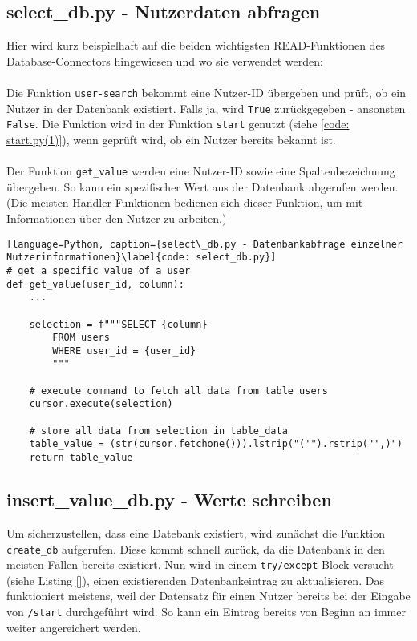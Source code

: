         \subsection{select\_db.py - Nutzerdaten abfragen} \label{Implementierung: select_db.py}
            Hier wird kurz beispielhaft auf die beiden wichtigsten READ-Funktionen des Database-Connectors hingewiesen und wo sie verwendet werden: \\
            \\
            Die Funktion \verb|user-search| bekommt eine Nutzer-ID übergeben und prüft, ob ein Nutzer in der Datenbank existiert. Falls ja, wird \verb|True| zurückgegeben - ansonsten \verb|False|. Die Funktion wird in der Funktion \verb|start| genutzt (siehe \ref*{code: start.py(1)}), wenn geprüft wird, ob ein Nutzer bereits bekannt ist.\\ 
            \\
            Der Funktion \verb|get_value| werden eine Nutzer-ID sowie eine Spaltenbezeichnung übergeben. So kann ein spezifischer Wert aus der Datenbank abgerufen werden. (Die meisten Handler-Funktionen bedienen sich dieser Funktion, um mit Informationen über den Nutzer zu arbeiten.) 
                \begin{lstlisting}[language=Python, caption={select\_db.py - Datenbankabfrage einzelner Nutzerinformationen}\label{code: select_db.py}]
# get a specific value of a user
def get_value(user_id, column):
    ...

    selection = f"""SELECT {column}
        FROM users
        WHERE user_id = {user_id}
        """

    # execute command to fetch all data from table users
    cursor.execute(selection)

    # store all data from selection in table_data
    table_value = (str(cursor.fetchone())).lstrip("('").rstrip("',)")
    return table_value
                \end{lstlisting}

        \subsection{insert\_value\_db.py - Werte schreiben} \label{Implementierung: insert_value_db.py}
            Um sicherzustellen, dass eine Datebank existiert, wird zunächst die Funktion \verb|create_db| aufgerufen. Diese kommt schnell zurück, da die Datenbank in den meisten Fällen bereits existiert. Nun wird in einem \verb|try/except|-Block versucht (siehe Listing \ref*{}), einen existierenden Datenbankeintrag zu aktualisieren. Das funktioniert meistens, weil der Datensatz für einen Nutzer bereits bei der Eingabe von \verb|/start| durchgeführt wird. So kann ein Eintrag bereits von Beginn an immer weiter angereichert werden.

